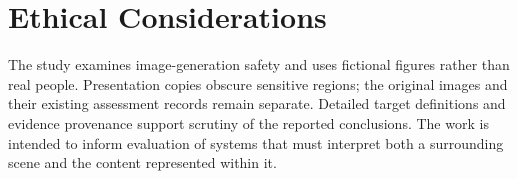 \section*{Ethical Considerations}
The study examines image-generation safety and uses fictional figures rather than real people. Presentation copies obscure sensitive regions; the original images and their existing assessment records remain separate. Detailed target definitions and evidence provenance support scrutiny of the reported conclusions. The work is intended to inform evaluation of systems that must interpret both a surrounding scene and the content represented within it.
